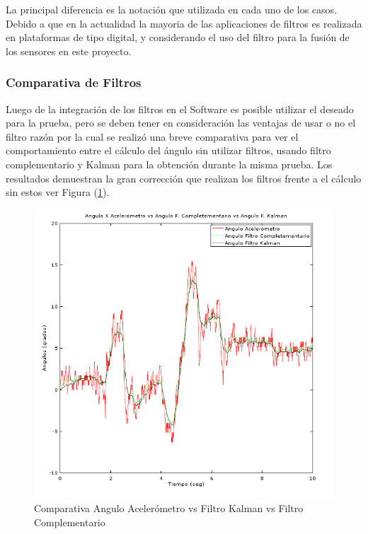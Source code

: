 \documentclass[12pt,a4paper]{article}
\begin{document}
La principal diferencia es la notación que utilizada en cada uno de los casos.
Debido a que en la actualidad la mayoria de las aplicaciones de filtros es realizada en plataformas de tipo digital, y considerando el uso del filtro para la fusión de los sensores en este proyecto.

\subsubsection{Comparativa de Filtros}
Luego de la integración de los filtros en el Software es posible utilizar el deseado para la prueba, pero se deben tener en consideración las ventajas de usar o no el filtro razón por la cual se realizó una breve comparativa para ver el comportamiento entre el cálculo del ángulo sin utilizar filtros, usando filtro complementario y Kalman para la obtención durante la misma prueba.
Los resultados demuestran la gran corrección que realizan los filtros frente a el cálculo sin estos ver Figura (\ref{fig:AnguloXvsFiltros}).


\begin{figure}[H]
\centering
  \includegraphics[scale=0.7]{images/angKalCom}
  \caption{Comparativa Angulo Acelerómetro vs Filtro Kalman vs Filtro Complementario}
  \label{fig:AnguloXvsFiltros}
\end{figure}
\end{document}
